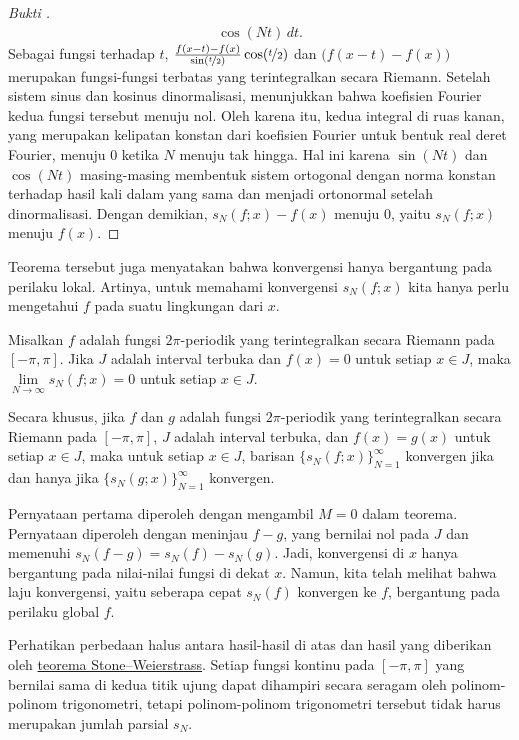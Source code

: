 \begin{proof}[Bukti ]
\begin{multline*}
\cos (Nt) \, dt .
\end{multline*}
Sebagai fungsi terhadap $t$, 
$\frac{f(x-t) - f(x)}{\sin(\nicefrac{t}{2})} \cos (\nicefrac{t}{2})$
dan
$\bigl( f(x-t) - f(x) \bigr)$ merupakan fungsi-fungsi terbatas yang terintegralkan secara Riemann.
Setelah sistem sinus dan kosinus dinormalisasi,  menunjukkan bahwa koefisien Fourier kedua fungsi tersebut menuju nol. Oleh karena itu, kedua
integral di ruas kanan, yang merupakan kelipatan konstan dari koefisien Fourier
untuk bentuk real deret Fourier, menuju 0 ketika $N$ menuju tak hingga.
Hal ini karena $\sin(Nt)$ dan $\cos(Nt)$ masing-masing membentuk sistem ortogonal
dengan norma konstan terhadap hasil kali dalam yang sama dan menjadi ortonormal setelah dinormalisasi.
Dengan demikian, $s_N(f;x)-f(x)$ menuju 0, yaitu $s_N(f;x)$ menuju $f(x)$.
\end{proof}

Teorema tersebut juga menyatakan bahwa konvergensi hanya bergantung pada perilaku lokal.
Artinya, untuk memahami konvergensi $s_N(f;x)$ kita hanya perlu mengetahui
$f$ pada suatu lingkungan dari $x$.

\begin{cor}
Misalkan $f$ adalah fungsi $2\pi$-periodik yang terintegralkan secara Riemann pada $[-\pi,\pi]$.
Jika $J$ adalah interval terbuka dan $f(x) = 0$ untuk setiap $x \in J$,
maka $\lim\limits_{N\to\infty} s_N(f;x) = 0$ untuk setiap $x \in J$.

Secara khusus, jika $f$ dan $g$ adalah fungsi $2\pi$-periodik
yang terintegralkan secara Riemann pada $[-\pi,\pi]$, $J$ adalah interval terbuka, dan $f(x) = g(x)$
untuk setiap $x \in J$, maka untuk setiap $x \in J$,
barisan
$\bigl\{ s_N(f;x) \bigr\}_{N=1}^\infty$ konvergen jika dan hanya jika
$\bigl\{ s_N(g;x) \bigr\}_{N=1}^\infty$ konvergen.
\end{cor}

Pernyataan pertama diperoleh dengan mengambil $M=0$ dalam teorema.
Pernyataan  diperoleh dengan meninjau $f-g$, yang
bernilai nol pada $J$ dan memenuhi $s_N(f-g) = s_N(f) - s_N(g)$.
Jadi, konvergensi di $x$ hanya bergantung pada nilai-nilai fungsi
di dekat $x$.
Namun, kita telah melihat bahwa laju konvergensi,
yaitu seberapa cepat $s_N(f)$
konvergen ke $f$, bergantung pada perilaku global $f$.

Perhatikan perbedaan halus antara hasil-hasil di atas dan hasil yang diberikan oleh
\hyperref[thm:SWcomplex]{teorema Stone--Weierstrass}.
Setiap fungsi kontinu pada $[-\pi,\pi]$ yang bernilai sama di kedua titik ujung
dapat dihampiri secara seragam
oleh polinom-polinom trigonometri, tetapi polinom-polinom trigonometri tersebut tidak harus
merupakan jumlah parsial $s_N$.

